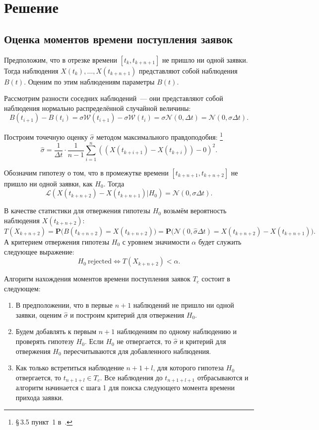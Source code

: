 \documentclass[a4paper,10pt]{article}
\begin{document}
\section{Решение}
\subsection{Оценка моментов времени поступления заявок}
Предположим, что в отрезке времени $[t_k, t_{k+n+1}]$ не пришло ни одной заявки.
Тогда наблюдения $X(t_k),\ldots,X(t_{k+n+1})$ представляют собой наблюдения
$B(t)$.
Оценим по этим наблюдениям параметры $B(t)$.

Рассмотрим разности соседних наблюдений~--- они представляют собой наблюдения 
нормально распределённой случайной величины:
$$B(t_{i+1}) - B(t_i) = 
    \sigma \mathcal{W}(t_{i+1}) - \sigma \mathcal{W}(t_i) = 
    \sigma \mathcal{N}(0, \Delta t) = 
    \mathcal{N}(0, \sigma \Delta t).$$

Построим точечную оценку $\widehat{\sigma}$ методом максимального правдоподобия:%
\footnote{\S\,3.5 пункт~1 в~\cite{ivchmed2010matstat}.}
$$\widehat{\sigma} = 
    \frac{1}{\Delta t}\cdot\frac{1}{n-1}
        \sum\limits_{i=1}^n ((X(t_{k+i+1}) - X(t_{k+i})) - 0)^2.$$

Обозначим гипотезу о том, что в промежутке времени 
$[t_{k+n+1}, t_{k+n+2}]$ не пришло ни одной заявки, 
как $H_0$.
Тогда 
$$\mathcal{L}(X(t_{k+n+2})-X(t_{k+n+1}) | H_0) = 
    \mathcal{N}(0, \sigma \Delta t).$$

В качестве статистики для отвержения гипотезы $H_0$ возьмём вероятность 
наблюдения $X(t_{k+n+2})$:
$$T(X_{k+n+2}) = 
    \mathbf{P}\big(B(t_{k+n+2})= X(t_{k+n+2})\big) = 
    \mathbf{P}\big(
      \mathcal{N}(0, \widehat{\sigma} \Delta t) = X(t_{k+n+2})-X(t_{k+n+1})\big).$$
А критерием отвержения гипотезы $H_0$ с уровнем значимости $\alpha$ 
будет служить следующее выражение:
$$H_0 \  \mathrm{rejected} \Longleftrightarrow T(X_{k+n+2}) < \alpha.$$

Алгоритм нахождения моментов времени поступления заявок $T_c$ 
состоит в следующем:
\begin{enumerate}
  \item В предположении, что в первые $n+1$ наблюдений не пришло ни одной 
  заявки, оценим $\widehat{\sigma}$ и построим критерий для отвержения $H_0$.
  \item Будем добавлять к первым $n+1$ наблюдениям по одному наблюдению и 
  проверять гипотезу $H_0$.
  Если $H_0$ не отвергается, то $\widehat{\sigma}$ и критерий для отвержения $H_0$ 
  пересчитываются для добавленного наблюдения.
  \item Как только встретиться наблюдение $n+1+l$, для которого гипотеза $H_0$
  отвергается, то \mbox{$t_{n+1+l} \in T_c$}. 
  Все наблюдения до $t_{n+1+l+1}$ отбрасываются и алгоритм начинается с шага 1
  для поиска следующего момента времени прихода заявки.
\end{enumerate}
\end{document}
